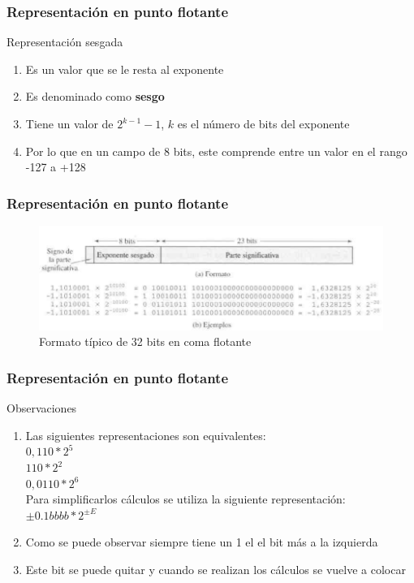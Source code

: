 \documentclass{beamer}
\begin{document}
\begin{frame}
	\frametitle{Representación en punto flotante}
	\begin{block}{Representación sesgada}
		\begin{enumerate}
			\item Es un valor que se le resta al exponente
			\item Es denominado como \textbf{sesgo}
			\item Tiene un valor de $2^{k-1}-1$, $k$ es el número de bits del exponente
			\item Por lo que en un campo de 8 bits, este comprende entre un valor en el rango -127  a +128
		\end{enumerate}
	\end{block}
\end{frame}



\begin{frame}
	\frametitle{Representación en punto flotante}
	\begin{figure}[H]
	\centering
	\includegraphics[scale=0.3]{imagenes/ejemplo.png}
	\caption{Formato típico de 32 bits en coma flotante}
	\end{figure}	
\end{frame}


\begin{frame}
	\frametitle{Representación en punto flotante}
	\begin{block}{Observaciones}
		\begin{enumerate}
			\item Las siguientes representaciones son equivalentes:\\
			$0,110*2^{5}$ \\
			$110*2^{2}$ \\
			$0,0110*2^{6}$ \\
			Para simplificarlos cálculos se utiliza la siguiente representación:\\
			$\pm 0.1bbbb * 2^{\pm E}$	
			\item Como se puede observar siempre tiene un 1 el el bit más a la izquierda
			\item Este bit se puede quitar y cuando se realizan los cálculos se vuelve a colocar
		\end{enumerate}
	\end{block}
\end{frame}
\end{document}
